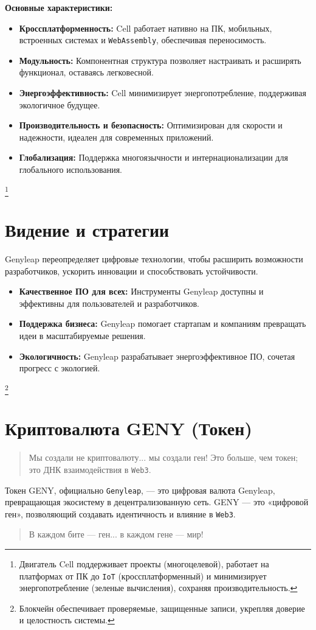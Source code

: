 \documentclass[a4paper,12pt,openany]{book}
\begin{document}
\textbf{Основные характеристики:}
\begin{itemize}
    \item \textbf{Кроссплатформенность:} Cell работает нативно на ПК, мобильных, встроенных системах и \texttt{WebAssembly}, обеспечивая переносимость.
    \item \textbf{Модульность:} Компонентная структура позволяет настраивать и расширять функционал, оставаясь легковесной.
    \item \textbf{Энергоэффективность:} Cell минимизирует энергопотребление, поддерживая экологичное будущее.
    \item \textbf{Производительность и безопасность:} Оптимизирован для скорости и надежности, идеален для современных приложений.
    \item \textbf{Глобализация:} Поддержка многоязычности и интернационализации для глобального использования.
\end{itemize}

\footnote{Двигатель Cell поддерживает проекты (многоцелевой), работает на платформах от ПК до \texttt{IoT} (кроссплатформенный) и минимизирует энергопотребление (зеленые вычисления), сохраняя производительность.}

\chapter{Видение и стратегии}

Genyleap переопределяет цифровые технологии, чтобы расширить возможности разработчиков, ускорить инновации и способствовать устойчивости.

\begin{itemize}
    \item \textbf{Качественное ПО для всех:} Инструменты Genyleap доступны и эффективны для пользователей и разработчиков.
    \item \textbf{Поддержка бизнеса:} Genyleap помогает стартапам и компаниям превращать идеи в масштабируемые решения.
    \item \textbf{Экологичность:} Genyleap разрабатывает энергоэффективное ПО, сочетая прогресс с экологией.
\end{itemize}

\footnote{Блокчейн обеспечивает проверяемые, защищенные записи, укрепляя доверие и целостность системы.}

\chapter{Криптовалюта GENY (Токен)}
\begin{quote}
Мы создали не криптовалюту... мы создали ген! Это больше, чем токен; это ДНК взаимодействия в \texttt{Web3}.
\end{quote}
Токен GENY, официально \texttt{Genyleap}, — это цифровая валюта Genyleap, превращающая экосистему в децентрализованную сеть. GENY — это «цифровой ген», позволяющий создавать идентичность и влияние в \texttt{Web3}.
\begin{quote}
В каждом бите — ген... в каждом гене — мир!
\end{quote}
\end{document}
